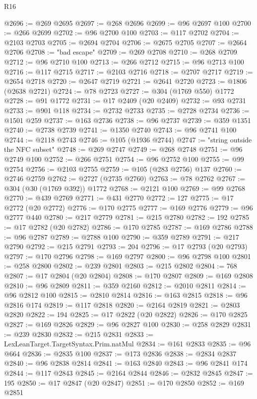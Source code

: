 \begin{lexlean}{R16}
\begin{coremodule}
@2696 := @269 @2695
@2697 := @268 @2696
@2699 := @96 @2697 @100
@2700 := @266 @2699
@2702 := @96 @2700 @100
@2703 := @117 @2702
@2704 := @2103 @2703
@2705 := @2694 @2704
@2706 := @2675 @2705
@2707 := @2664 @2706
@2708 := "bad escape"
@2709 := @269 @2708
@2710 := @268 @2709
@2712 := @96 @2710 @100
@2713 := @266 @2712
@2715 := @96 @2713 @100
@2716 := @117 @2715
@2717 := @2103 @2716
@2718 := @2707 @2717
@2719 := @2654 @2718
@2720 := @2647 @2719
@2721 := @2641 @2720
@2723 := @1806 (@2638 @2721)
@2724 := @78 @2723
@2727 := @304 (@1769 @550) @1772
@2728 := @91 @1772
@2731 := @17 @2409 (@20 @2409)
@2732 := @93 @2731
@2733 := @901 @118
@2734 := @2732 @2733
@2735 := @2728 @2734
@2736 := @1501 @259
@2737 := @163 @2736
@2738 := @96 @2737
@2739 := @359 @1351
@2740 := @2738 @2739
@2741 := @1350 @2740
@2743 := @96 @2741 @100
@2744 := @2118 @2743
@2746 := @105 (@1936 @2744)
@2747 := "string outside the NFC subset"
@2748 := @269 @2747
@2749 := @268 @2748
@2751 := @96 @2749 @100
@2752 := @266 @2751
@2754 := @96 @2752 @100
@2755 := @99 @2754
@2756 := @2103 @2755
@2759 := @105 (@283 @2756) @137
@2760 := @2746 @2759
@2762 := @2727 (@2735 @2760)
@2763 := @78 @2762
@2767 := @304 (@30 (@1769 @392)) @1772
@2768 := @2121 @100
@2769 := @99 @2768
@2770 := @439 @2769
@2771 := @431 @2770
@2772 := 127
@2775 := @17 @2772 (@20 @2772)
@2776 := @170 @2775
@2777 := @169 @2776
@2779 := @96 @2777 @440
@2780 := @217 @2779
@2781 := @215 @2780
@2782 := 192
@2785 := @17 @2782 (@20 @2782)
@2786 := @170 @2785
@2787 := @169 @2786
@2788 := @96 @2787
@2789 := @2788 @100
@2790 := @359 @2789
@2791 := @217 @2790
@2792 := @215 @2791
@2793 := 204
@2796 := @17 @2793 (@20 @2793)
@2797 := @170 @2796
@2798 := @169 @2797
@2800 := @96 @2798 @100
@2801 := @258 @2800
@2802 := @239 @2801
@2803 := @215 @2802
@2804 := 768
@2807 := @17 @2804 (@20 @2804)
@2808 := @170 @2807
@2809 := @169 @2808
@2810 := @96 @2809
@2811 := @359 @2160
@2812 := @2010 @2811
@2814 := @96 @2812 @100
@2815 := @2810 @2814
@2816 := @163 @2815
@2818 := @96 @2816 @174
@2819 := @117 @2818
@2820 := @2164 @2819
@2821 := @2803 @2820
@2822 := 194
@2825 := @17 @2822 (@20 @2822)
@2826 := @170 @2825
@2827 := @169 @2826
@2829 := @96 @2827 @100
@2830 := @258 @2829
@2831 := @239 @2830
@2832 := @215 @2831
@2833 := LexLeanTarget.TargetSyntax.Prim.natMul
@2834 := @161 @2833
@2835 := @96 @664
@2836 := @2835 @100
@2837 := @173 @2836
@2838 := @2834 @2837
@2840 := @96 @2838 @2814
@2841 := @163 @2840
@2843 := @96 @2841 @174
@2844 := @117 @2843
@2845 := @2164 @2844
@2846 := @2832 @2845
@2847 := 195
@2850 := @17 @2847 (@20 @2847)
@2851 := @170 @2850
@2852 := @169 @2851

\end{coremodule}
\end{lexlean}
